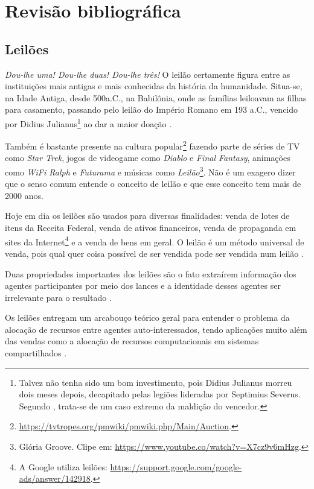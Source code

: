 \chapter{Revisão bibliográfica}
\label{cap:revisao}

\section{Leilões}

\emph{Dou-lhe uma! Dou-lhe duas! Dou-lhe três!} O leilão certamente figura entre as instituições mais antigas e mais conhecidas da história da humanidade. Situa-se, na Idade Antiga, desde 500a.C., na Babilônia, onde as famílias leiloavam as filhas para casamento, passando pelo leilão do Império Romano em 193 a.C., vencido por Didius Julianus\footnote{Talvez não tenha sido um bom investimento, pois Didius Julianus morreu dois meses depois, decapitado pelas legiões lideradas por Septimius Severus. Segundo \citet{krishna}, trata-se de um caso extremo da maldição do vencedor.} ao dar a maior doação \citet{Cassady2021-ac}.

Também é bastante presente na cultura popular\footnote{\url{https://tvtropes.org/pmwiki/pmwiki.php/Main/Auction}.} fazendo parte de séries de TV como \emph{Star Trek}, jogos de videogame como \emph{Diablo} e \emph{Final Fantasy}, animações como \emph{WiFi Ralph} e \emph{Futurama} e músicas como \emph{Leilão}\footnote{Glória Groove. Clipe em: \url{https://www.youtube.co/watch?v=X7cz9v6mHzg}.}. Não é um exagero dizer que o senso comum entende o conceito de leilão e que esse conceito tem mais de 2000 anos.

Hoje em dia os leilões são usados para diversas finalidades: venda de lotes de itens da Receita Federal, venda de ativos financeiros, venda de propaganda em sites da Internet\footnote{A Google utiliza leilões: \url{https://support.google.com/google-ads/answer/142918}.} e a venda de bens em geral. O leilão é um método universal de venda, pois qual quer coisa possível de ser vendida pode ser vendida num leilão \citet{krishna}.

Duas propriedades importantes dos leilões são o fato extraírem informação dos agentes participantes por meio dos lances e a identidade desses agentes ser irrelevante para o resultado \citet{krishna}.

Os leilões entregam um arcabouço teórico geral para entender o problema da alocação de recursos entre agentes auto-interessados, tendo aplicações muito além das vendas como a alocação de recursos computacionais em sistemas compartilhados \citet{Shoham2008}.

